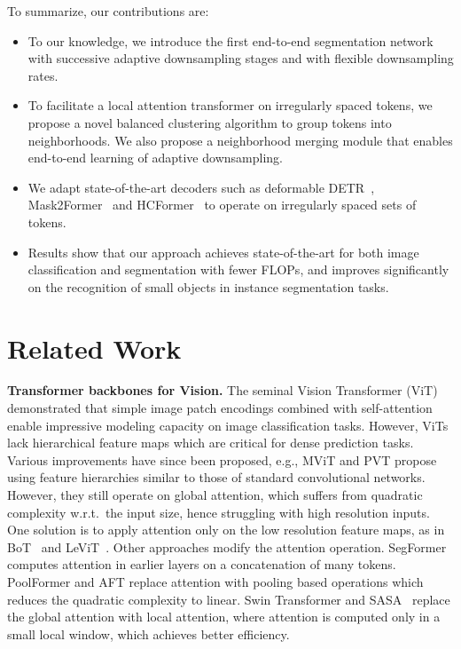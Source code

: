 \documentclass[10pt,twocolumn,letterpaper]{article}
\begin{document}
To summarize, our contributions are: \begin{itemize}[noitemsep,topsep=0pt,parsep=0pt,partopsep=0pt]\item To our knowledge, we introduce the first end-to-end segmentation network with successive adaptive downsampling stages and with flexible downsampling rates.
    \item To facilitate a local attention transformer on irregularly spaced tokens, we propose a novel balanced clustering algorithm to group tokens into neighborhoods.  We also propose a neighborhood merging module that enables  end-to-end learning of adaptive downsampling.
    \item We adapt state-of-the-art decoders such as deformable  DETR~\cite{deformable}, Mask2Former~\cite{mask2} and HCFormer~\cite{hcformer} to operate on irregularly spaced sets of tokens.
    \item Results show that our approach achieves  state-of-the-art for both image classification and segmentation with fewer FLOPs, and improves   significantly on the recognition of small objects in instance segmentation tasks. \end{itemize}






\section{Related Work}\label{sec:relwork}

\noindent\textbf{Transformer backbones for Vision.}
The seminal Vision Transformer (ViT)~\cite{vit} demonstrated that simple image patch encodings combined with self-attention enable impressive modeling capacity on image classification tasks. However, ViTs lack hierarchical feature maps which are critical for dense prediction tasks. Various improvements have since been proposed, e.g., MViT and PVT \cite{fan2021multiscale,wang2021pyramid} propose using feature hierarchies similar to those of standard convolutional networks. However, they still operate on global attention, which suffers from quadratic complexity w.r.t.\ the input size, hence struggling with high resolution inputs. One solution is to apply attention only on the low resolution feature maps, as in BoT~\cite{srinivas2021bottleneck} and LeViT~\cite{levit}. Other approaches modify the attention operation. SegFormer\cite{segformer} computes attention in earlier layers on a concatenation of many tokens.  PoolFormer and AFT\cite{yu2022metaformer,zhai2021attention} replace attention with pooling based operations which reduces the quadratic complexity to linear. 
Swin Transformer and SASA~\cite{swin,sasa} replace the global attention with local attention, where attention is computed only in a small local window, which achieves better efficiency. 
\end{document}
